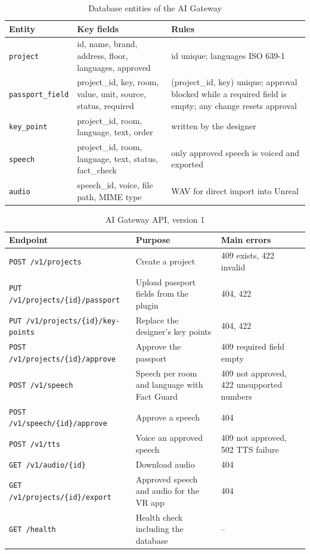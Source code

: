 \begin{table}[H]
\centering
\begin{tightblock}
\footnotesize
\begin{tabularx}{\textwidth}{P{2.4cm} P{5.2cm} L}
\toprule
\textbf{Entity} & \textbf{Key fields} & \textbf{Rules} \\
\midrule
\texttt{project} & id, name, brand, address, floor, languages, approved & id unique; languages ISO 639-1 \\
\texttt{passport\_field} & project\_id, key, room, value, unit, source, status, required & (project\_id, key) unique; approval blocked while a required field is empty; any change resets approval \\
\texttt{key\_point} & project\_id, room, language, text, order & written by the designer \\
\texttt{speech} & project\_id, room, language, text, status, fact\_check & only approved speech is voiced and exported \\
\texttt{audio} & speech\_id, voice, file path, MIME type & WAV for direct import into Unreal \\
\bottomrule
\end{tabularx}
\end{tightblock}
\caption{Database entities of the AI Gateway}
\label{tab:entities}
\end{table}

\begin{table}[H]
\centering
\begin{tightblock}
\footnotesize
\begin{tabularx}{\textwidth}{P{4.8cm} L P{3.6cm}}
\toprule
\textbf{Endpoint} & \textbf{Purpose} & \textbf{Main errors} \\
\midrule
\texttt{POST /v1/projects} & Create a project & 409 exists, 422 invalid \\
\texttt{PUT /v1/projects/\{id\}/passport} & Upload passport fields from the plugin & 404, 422 \\
\texttt{PUT /v1/projects/\{id\}/key-points} & Replace the designer's key points & 404, 422 \\
\texttt{POST /v1/projects/\{id\}/approve} & Approve the passport & 409 required field empty \\
\texttt{POST /v1/speech} & Speech per room and language with Fact Guard & 409 not approved, 422 unsupported numbers \\
\texttt{POST /v1/speech/\{id\}/approve} & Approve a speech & 404 \\
\texttt{POST /v1/tts} & Voice an approved speech & 409 not approved, 502 TTS failure \\
\texttt{GET /v1/audio/\{id\}} & Download audio & 404 \\
\texttt{GET /v1/projects/\{id\}/export} & Approved speech and audio for the VR app & 404 \\
\texttt{GET /health} & Health check including the database & -- \\
\bottomrule
\end{tabularx}
\end{tightblock}
\caption{AI Gateway API, version 1}
\label{tab:api}
\end{table}

